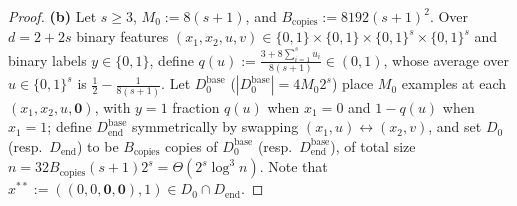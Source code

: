 \documentclass[11pt]{article}
\theoremstyle{definition}
\begin{document}
\begin{proof}
\textbf{(b)} Let $s \ge 3$, $M_0 := 8(s+1)$, and $B_{\mathrm{copies}} := 8192(s+1)^2$. Over $d = 2 + 2s$ binary features $(x_1, x_2, u, v) \in \{0,1\} \times \{0,1\} \times \{0,1\}^s \times \{0,1\}^s$ and binary labels $y \in \{0,1\}$, define $q(u) := \frac{3 + 8\sum_{i=1}^s u_i}{8(s+1)} \in (0, 1)$, whose average over $u \in \{0,1\}^s$ is $\frac{1}{2} - \frac{1}{8(s+1)}$. Let $D_0^{\mathrm{base}}$ ($|D_0^{\mathrm{base}}| = 4 M_0 2^s$) place $M_0$ examples at each $(x_1, x_2, u, \mathbf{0})$, with $y=1$ fraction $q(u)$ when $x_1 = 0$ and $1 - q(u)$ when $x_1 = 1$; define $D_{\mathrm{end}}^{\mathrm{base}}$ symmetrically by swapping $(x_1, u) \leftrightarrow (x_2, v)$, and set $D_0$ (resp.\ $D_{\mathrm{end}}$) to be $B_{\mathrm{copies}}$ copies of $D_0^{\mathrm{base}}$ (resp.\ $D_{\mathrm{end}}^{\mathrm{base}}$), of total size $n = 32 B_{\mathrm{copies}} (s+1) 2^s = \Theta(2^s \log^3 n)$. Note that $x^{**} := ((0,0,\mathbf{0},\mathbf{0}), 1) \in D_0 \cap D_{\mathrm{end}}$.


\end{proof}
\end{document}
